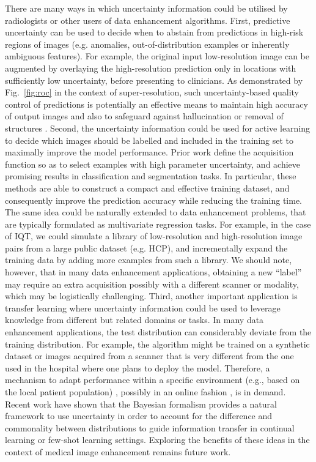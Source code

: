 There are many ways in which uncertainty information could be utilised by radiologists or other users of data enhancement algorithms. First, predictive uncertainty can be used to decide when to abstain from predictions in high-risk regions of images (e.g. anomalies, out-of-distribution examples or inherently ambiguous features). For example, the original input low-resolution image can be augmented by overlaying the high-resolution prediction only in locations with sufficiently low uncertainty, before presenting to clinicians. As demonstrated by Fig.~\ref{fig:roc} in the context of super-resolution, such uncertainty-based quality control of predictions is potentially an effective means to maintain high accuracy of output images and also to safeguard against hallucination or removal of structures \cite{cohen2018distribution}. Second, the uncertainty information could be used for active learning \cite{settles2009active} to decide which images should be labelled and included in the training set to maximally improve the model performance. Prior work \cite{gal2017deep,gorriz2017cost} define the acquisition function so as to select examples with high parameter uncertainty, and achieve promising results in classification and segmentation tasks. In particular, these methods are able to construct a compact and effective training dataset, and consequently improve the prediction accuracy while reducing the training time. The same idea could be naturally extended to data enhancement problems, that are typically formulated as multivariate regression tasks. For example, in the case of IQT, we could simulate a library of low-resolution and high-resolution image pairs from a large public dataset (e.g. HCP), and incrementally expand the training data by adding more examples from such a library. We should note, however, that in many data enhancement applications, obtaining a new ``label'' may require an extra acquisition possibly with a different scanner or modality, which may be logistically challenging. Third, another important application is transfer learning \cite{pan2010survey} where uncertainty information could be used to leverage knowledge from different but related domains or tasks. In many data enhancement applications, the test distribution can considerably deviate from the training distribution. For example, the algorithm might be trained on a synthetic dataset or images acquired from a scanner that is very different from the one used in the hospital where one plans to deploy the model. Therefore, a mechanism to adapt performance within a specific environment (e.g., based on the local patient population) \cite{kamnitsas2017unsupervised}, possibly in an online fashion \cite{karani2018lifelong,baweja2018towards}, is in demand. Recent work have shown that the Bayesian formalism provides a natural framework to use uncertainty in order to account for the difference and commonality between distributions to guide information transfer in continual learning \cite{kirkpatrick2017overcoming,nguyen2017variational} or few-shot learning \cite{finn2018probabilistic,yoon2018bayesian} settings. Exploring the benefits of these ideas in the context of medical image enhancement remains future work.


